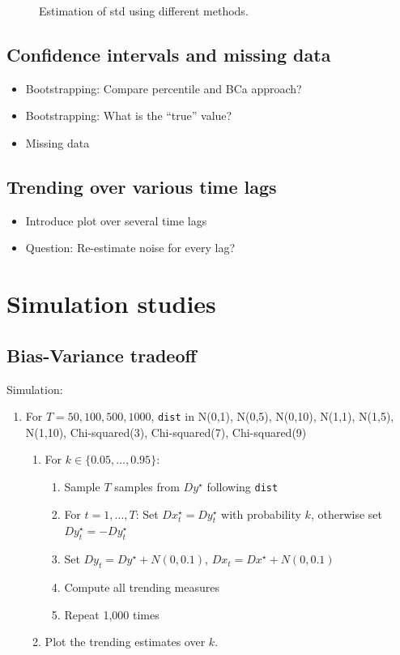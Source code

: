 \documentclass[oneside]{article}
\theoremstyle{plain}%
\theoremstyle{definition}
\newcommand{\ydiff}{D y}
\newcommand{\ydifft}{Dy^\star}
\newcommand{\xdiff}{Dx}
\newcommand{\xdifft}{Dx^\star}
\begin{document}
\begin{figure}
  \caption{Estimation of std using different methods.}
  \label{fig:estimation std}
\end{figure}


\subsection{Confidence intervals and missing data}


\begin{itemize}
  \item Bootstrapping: Compare percentile and BCa approach?
  \item Bootstrapping: What is the \enquote{true} value?
  \item Missing data
\end{itemize}

\subsection{Trending over various time lags}

\begin{itemize}
    \item Introduce plot over several time lags
    \item Question: Re-estimate noise for every lag? 
\end{itemize}


\section{Simulation studies}

\subsection{Bias-Variance tradeoff}

Simulation:
\begin{enumerate}
    \item For $T = 50, 100, 500, 1000$, \verb|dist| in N(0,1), N(0,5), N(0,10), N(1,1), N(1,5), N(1,10), Chi-squared(3), Chi-squared(7), Chi-squared(9)
    \begin{enumerate}
        \item For $k \in \{0.05, \dots, 0.95\}$:
        \begin{enumerate}
            \item Sample $T$ samples from $\ydifft$ following \verb|dist|
            \item For $t = 1, \dots, T$: Set $\xdifft_t = \ydifft_t$ with probability $k$, otherwise set $\ydifft_t = - \ydifft_t$
            \item Set $\ydiff_t = \ydifft + N(0,0.1)$, $\xdiff_t = \xdifft + N(0,0.1)$
            \item Compute all trending measures
            \item Repeat 1,000 times
        \end{enumerate}
        \item Plot the trending estimates over $k$.
    \end{enumerate}
\end{enumerate}
\end{document}
